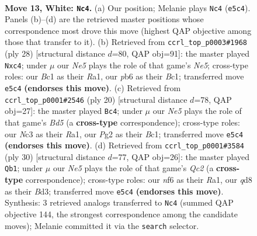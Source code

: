 \documentclass[11pt]{article}
\begin{document}
\clearpage

\begin{figure}[p]\centering
\begin{subfigure}{0.46\textwidth}\centering
\resizebox{\linewidth}{!}{%
\newchessgame
\chessboard[
  setfen={rnbqkb1r/5p2/1p2pnp1/p3N3/P2P3p/1BN4P/1P3PP1/R1BQ1RK1 w kq - 0 13},
  showmover=false,
  pgfstyle=straightmove, color=movearrow, markmove={e5-c4}
]}
\caption{}
\end{subfigure}\hfill
\begin{subfigure}{0.46\textwidth}\centering
\resizebox{\linewidth}{!}{%
\newchessgame
\chessboard[
  setfen={rn1qk2r/p4ppp/4p3/b3N3/P1ppnP2/6P1/NP2P2P/R1BQ1RK1 w kq - 0 15},
  showmover=false,
  pgfstyle=straightmove, color=movearrow, markmove={e5-c4}
]}
\caption{}
\end{subfigure}
\\[4pt]
\begin{subfigure}{0.46\textwidth}\centering
\resizebox{\linewidth}{!}{%
\newchessgame
\chessboard[
  setfen={r1bqk2r/pp2npbp/3p2p1/2pB4/4PN2/6P1/PPPP3P/R1BQ1RK1 w kq - 3 11},
  showmover=false,
  pgfstyle=straightmove, color=movearrow, markmove={d5-c4}
]}
\caption{}
\end{subfigure}\hfill
\begin{subfigure}{0.46\textwidth}\centering
\resizebox{\linewidth}{!}{%
\newchessgame
\chessboard[
  setfen={r1bqr1k1/p2n1pbn/3p2p1/2pP3N/P1P5/1p1B1N1P/1PQ2PP1/R1B2RK1 w - - 0 16},
  showmover=false,
  pgfstyle=straightmove, color=movearrow, markmove={c2-b1}
]}
\caption{}
\end{subfigure}
\caption{\textbf{Move 13, White: \texttt{Nc4}.} (a) Our position; Melanie plays \texttt{Nc4} (\texttt{e5c4}). Panels (b)--(d) are the retrieved master positions whose correspondence most drove this move (highest QAP objective among those that transfer to it). (b) Retrieved from \texttt{ccrl\_top\_p0003\#1968} (ply 28) [structural distance $d$=80, QAP obj=91]: the master played \texttt{Nxc4}; under $\mu$ our \emph{Ne5} plays the role of that game's \emph{Ne5}; cross-type roles: our \emph{B}c1 as their \emph{R}a1, our \emph{p}b6 as their \emph{B}c1; transferred move \texttt{e5c4} \textbf{(endorses this move)}. (c) Retrieved from \texttt{ccrl\_top\_p0001\#2546} (ply 20) [structural distance $d$=78, QAP obj=27]: the master played \texttt{Bc4}; under $\mu$ our \emph{Ne5} plays the role of that game's \emph{Bd5} (a \textbf{cross-type} correspondence); cross-type roles: our \emph{N}c3 as their \emph{R}a1, our \emph{P}g2 as their \emph{B}c1; transferred move \texttt{e5c4} \textbf{(endorses this move)}. (d) Retrieved from \texttt{ccrl\_top\_p0001\#3584} (ply 30) [structural distance $d$=77, QAP obj=26]: the master played \texttt{Qb1}; under $\mu$ our \emph{Ne5} plays the role of that game's \emph{Qc2} (a \textbf{cross-type} correspondence); cross-type roles: our \emph{n}f6 as their \emph{R}a1, our \emph{q}d8 as their \emph{B}d3; transferred move \texttt{e5c4} \textbf{(endorses this move)}. Synthesis: 3 retrieved analogs transferred to \texttt{Nc4} (summed QAP objective 144, the strongest correspondence among the candidate moves); Melanie committed it via the \texttt{search} selector.}
\label{fig:thought-m24}
\end{figure}
\end{document}

